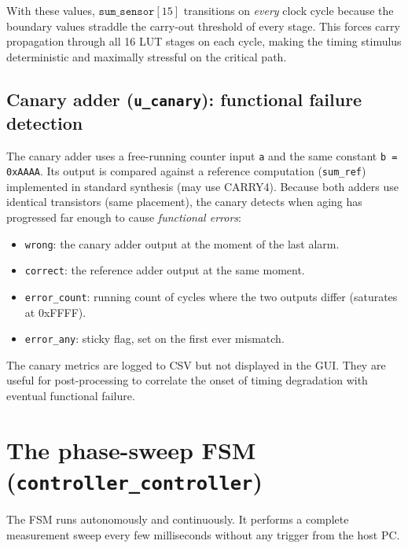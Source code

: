 \documentclass[12pt, a4paper]{report}
\begin{document}
With these values, $\texttt{sum\_sensor}[15]$ transitions on \emph{every} clock cycle
because the boundary values straddle the carry-out threshold of every stage. This
forces carry propagation through all 16 LUT stages on each cycle, making the timing
stimulus deterministic and maximally stressful on the critical path.

\subsection{Canary adder (\texttt{u\_canary}): functional failure detection}

The canary adder uses a free-running counter input \texttt{a} and the same constant
\texttt{b = 0xAAAA}. Its output is compared against a reference computation
(\texttt{sum\_ref}) implemented in standard synthesis (may use CARRY4). Because
both adders use identical transistors (same placement), the canary detects when
aging has progressed far enough to cause \emph{functional errors}:

\begin{itemize}
  \item \texttt{wrong}: the canary adder output at the moment of the last alarm.
  \item \texttt{correct}: the reference adder output at the same moment.
  \item \texttt{error\_count}: running count of cycles where the two outputs differ (saturates at 0xFFFF).
  \item \texttt{error\_any}: sticky flag, set on the first ever mismatch.
\end{itemize}

\begin{infobox}
The canary metrics are logged to CSV but not displayed in the GUI. They are useful
for post-processing to correlate the onset of timing degradation with eventual
functional failure.
\end{infobox}

\section{The phase-sweep FSM (\texttt{controller\_controller})}

The FSM runs autonomously and continuously. It performs a complete measurement sweep
every few milliseconds without any trigger from the host PC.
\end{document}
